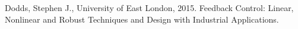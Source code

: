 \begin{thebibliography}{11} %
		Dodds, Stephen J., University of East London, 2015. Feedback Control: Linear, Nonlinear and Robust Techniques and Design with Industrial Applications.
\end{thebibliography}